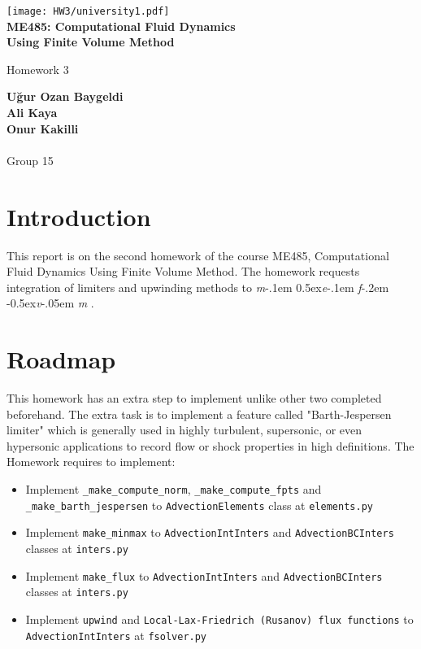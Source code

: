 \documentclass[a4paper, 12pt]{article}
\newcommand\mefvm{%
    \textit{m}\kern-.1em%
    \raise0.5ex\hbox{\textit{e}}\kern-.1em%
    \textit{f}\kern-.2em%
    \raise-0.5ex\hbox{\textit{v}}\kern-.05em%
    \textit{m}
}
\begin{document}
\doublespacing
\begin{titlepage}
    \begin{center}
        \texttt{[image: HW3/university1.pdf]}\\
        
        \textbf{ME485: Computational Fluid Dynamics \\ Using Finite Volume Method}

        \vspace{0.5cm}
        Homework 3
            
        \vspace{1.5cm}

        \textbf{Uğur Ozan Baygeldi}\\
        \textbf{Ali Kaya}\\ 
        \textbf{Onur Kakilli}\\~\\
        Group 15
        
    \end{center}
\end{titlepage}

\section{Introduction}

This report is on the second homework of the course ME485, Computational Fluid Dynamics Using Finite Volume Method. The homework requests integration of limiters and upwinding methods to \mefvm\!. \nocite{gi} \nocite{hw1} \nocite{hw2}

\section{Roadmap}
This homework has an extra step to implement unlike other two completed beforehand. The extra task is to implement a feature called "Barth-Jespersen limiter" which is generally used in highly turbulent, supersonic, or even hypersonic applications to record flow or shock properties in high definitions. The Homework requires to implement:

\begin{itemize}
    \item Implement \verb|_make_compute_norm|, \verb|_make_compute_fpts| and \\\verb|_make_barth_jespersen| to \verb|AdvectionElements| class at \verb|elements.py|
    
    \item Implement \verb|make_minmax| to \verb|AdvectionIntInters| and \verb|AdvectionBCInters| classes at \verb|inters.py|
    
    \item Implement \verb|make_flux| to \verb|AdvectionIntInters| and \verb|AdvectionBCInters| classes at \verb|inters.py|
    
    \item Implement \verb|upwind| and \verb|Local-Lax-Friedrich (Rusanov) flux functions| to \\\verb|AdvectionIntInters| at \verb|fsolver.py|
\end{itemize} \par
\end{document}
